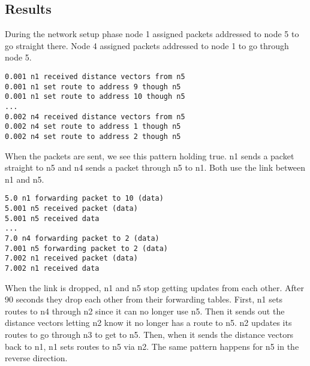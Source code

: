 \documentclass[11pt]{article}
\begin{document}
\vspace{5mm}

\subsection{Results}

During the network setup phase node 1 assigned packets addressed to node 5 to go straight there. Node 4 assigned packets addressed to node 1 to go through node 5.

\vspace{5mm}

\begin{lstlisting}
0.001 n1 received distance vectors from n5
0.001 n1 set route to address 9 though n5
0.001 n1 set route to address 10 though n5
...
0.002 n4 received distance vectors from n5
0.002 n4 set route to address 1 though n5
0.002 n4 set route to address 2 though n5
\end{lstlisting}

\vspace{5mm}

When the packets are sent, we see this pattern holding true. n1 sends a packet straight to n5 and n4 sends a packet through n5 to n1. Both use the link between n1 and n5.

\vspace{5mm}

\begin{lstlisting}
5.0 n1 forwarding packet to 10 (data)
5.001 n5 received packet (data)
5.001 n5 received data
...
7.0 n4 forwarding packet to 2 (data)
7.001 n5 forwarding packet to 2 (data)
7.002 n1 received packet (data)
7.002 n1 received data
\end{lstlisting}

\vspace{5mm}

When the link is dropped, n1 and n5 stop getting updates from each other. After 90 seconds they drop each other from their forwarding tables. First, n1 sets routes to n4 through n2 since it can no longer use n5. Then it sends out the distance vectors letting n2 know it no longer has a route to n5. n2 updates its routes to go through n3 to get to n5. Then, when it sends the distance vectors back to n1, n1 sets routes to n5 via n2. The same pattern happens for n5 in the reverse direction.

\vspace{5mm}
\end{document}
